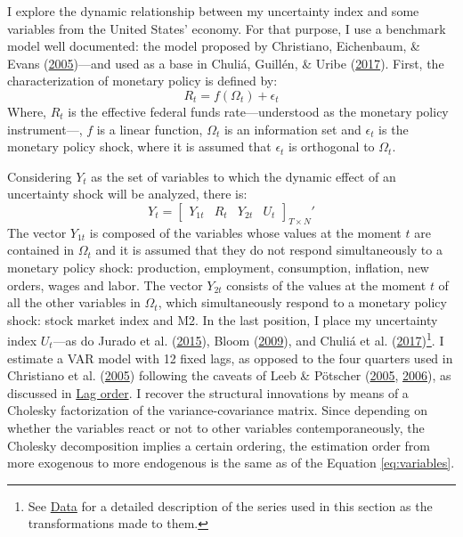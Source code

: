 \documentclass[12pt,twoside]{reedthesis}
\begin{document}
I explore the dynamic relationship between my uncertainty index and some variables from the United States' economy. For that purpose, I use a benchmark model well documented: the model proposed by Christiano, Eichenbaum, \& Evans (\protect\hyperlink{ref-chrieichevan:2005}{2005})---and used as a base in Chuliá, Guillén, \& Uribe (\protect\hyperlink{ref-chulguilurib:2017}{2017}). First, the characterization of monetary policy is defined by:
\begin{equation}
    R_{t} = f(\Omega_{t}) + \epsilon_{t} \label{eq:R}
\end{equation}
Where, \(R_ {t}\) is the effective federal funds rate---understood as the monetary policy instrument---, \(f\) is a linear function, \(\Omega_{t}\) is an information set and \(\epsilon_{t}\) is the monetary policy shock, where it is assumed that \(\epsilon_{t}\) is orthogonal to \(\Omega_{t}\).

Considering \(Y_{t}\) as the set of variables to which the dynamic effect of an uncertainty shock will be analyzed, there is:
\begin{equation}
    Y_{t} = 
    \begin{bmatrix}
      Y_{1t} & R_{t} & Y_{2t} & U_{t} \label{eq:variables}
    \end{bmatrix}_{T \times N}'
\end{equation}
The vector \(Y_{1t}\) is composed of the variables whose values at the moment \(t\) are contained in \(\Omega_{t}\) and it is assumed that they do not respond simultaneously to a monetary policy shock: production, employment, consumption, inflation, new orders, wages and labor. The vector \(Y_{2t}\) consists of the values at the moment \(t\) of all the other variables in \(\Omega_{t}\), which simultaneously respond to a monetary policy shock: stock market index and M2. In the last position, I place my uncertainty index \(U_{t}\)---as do Jurado et al. (\protect\hyperlink{ref-juraludvng:2015}{2015}), Bloom (\protect\hyperlink{ref-bloom:2009}{2009}), and Chuliá et al. (\protect\hyperlink{ref-chulguilurib:2017}{2017})\footnote{See \protect\hyperlink{data}{Data} for a detailed description of the series used in this section as the transformations made to them.}. I estimate a VAR model with 12 fixed lags, as opposed to the four quarters used in Christiano et al. (\protect\hyperlink{ref-chrieichevan:2005}{2005}) following the caveats of Leeb \& Pötscher (\protect\hyperlink{ref-leebpots:2005}{2005}, \protect\hyperlink{ref-leebpots:2006}{2006}), as discussed in \protect\hyperlink{lag-order}{Lag order}. I recover the structural innovations by means of a Cholesky factorization of the variance-covariance matrix. Since depending on whether the variables react or not to other variables contemporaneously, the Cholesky decomposition implies a certain ordering, the estimation order from more exogenous to more endogenous is the same as of the Equation \eqref{eq:variables}.
\end{document}
